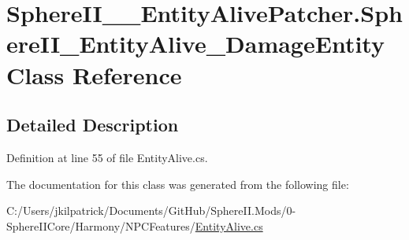 \hypertarget{class_sphere_i_i_____entity_alive_patcher_1_1_sphere_i_i___entity_alive___damage_entity}{}\section{Sphere\+I\+I\+\_\+\+\_\+\+Entity\+Alive\+Patcher.\+Sphere\+I\+I\+\_\+\+Entity\+Alive\+\_\+\+Damage\+Entity Class Reference}
\label{class_sphere_i_i_____entity_alive_patcher_1_1_sphere_i_i___entity_alive___damage_entity}


\subsection{Detailed Description}


Definition at line 55 of file Entity\+Alive.\+cs.



The documentation for this class was generated from the following file\+:\begin{DoxyCompactItemize}
\item 
C\+:/\+Users/jkilpatrick/\+Documents/\+Git\+Hub/\+Sphere\+I\+I.\+Mods/0-\/\+Sphere\+I\+I\+Core/\+Harmony/\+N\+P\+C\+Features/\mbox{\hyperlink{_entity_alive_8cs}{Entity\+Alive.\+cs}}\end{DoxyCompactItemize}
